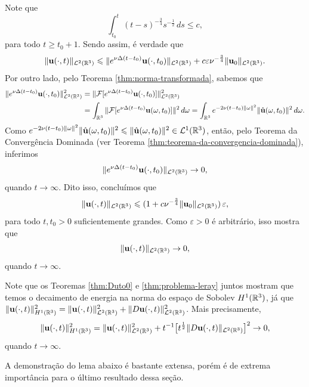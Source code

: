 \begin{prf}
\[    \]
    Note que
    \[
        \int_{t_0}^t (t - s)^{-\frac{3}{4}}s^{-\frac{1}{2}}\,ds \leqslant c,
    \]
    para todo $t \geqslant t_0 + 1$. Sendo assim, é verdade que
    \[
        \Vert \mathbf{u}(\cdot,t) \Vert_{\mathcal{L}^2(\mathbb{R}^3)} \leqslant \Vert e^{\nu\Delta(t - t_0)} \mathbf{u}(\cdot,t_0) \Vert_{\mathcal{L}^2(\mathbb{R}^3)} + c\varepsilon\nu^{-\frac{3}{4}} \Vert \mathbf{u}_0 \Vert_{\mathcal{L}^2(\mathbb{R}^3)}.
    \]
    Por outro lado, pelo Teorema \ref{thm:norma-transformada}, sabemos que
    \[
        \begin{aligned}
            \Vert e^{\nu \Delta (t-t_0)} \mathbf{u}(\cdot,t_0) \Vert_{\mathcal{L}^2(\mathbb{R}^3)}^2 &= \Vert \mathcal{F} [ e^{\nu \Delta (t-t_0) }\mathbf{u}(\cdot,t_0)] \Vert_{\mathcal{L}^2(\mathbb{R}^3)}^2\\ &= \int_{\mathbb{R}^3} \Vert \mathcal{F}[ e^{\nu \Delta (t-t_0)} \mathbf{u}(\omega,t_0)]\Vert^2 \,d\omega = \int_{\mathbb{R}^3} e^{-2\nu (t-t_0) \Vert \omega \Vert^2} \Vert \hat{\mathbf{u}} (\omega,t_0) \Vert^2 \,d\omega.
        \end{aligned}
    \]
    Como $e^{-2\nu (t-t_0) \Vert \omega \Vert^2} \Vert \hat{\mathbf{u}}(\omega,t_0) \Vert^2 \leqslant \Vert \hat{\mathbf{u}}(\omega,t_0) \Vert^2 \in \mathcal{L}^1(\mathbb{R}^3)$, então, pelo Teorema da Convergência Dominada (ver Teorema \ref{thm:teorema-da-convergencia-dominada}), inferimos
    \[
        \Vert e^{\nu \Delta (t-t_0)} \mathbf{u}(\cdot,t_0) \Vert_{\mathcal{L}^2(\mathbb{R}^3)} \to 0,
    \]
    quando $t \to \infty$. Dito isso, concluímos que
    \[
        \Vert \mathbf{u}(\cdot,t) \Vert_{\mathcal{L}^2(\mathbb{R}^3)} \leqslant (1 + c \nu^{-\frac{3}{4}} \Vert \mathbf{u}_0 \Vert_{\mathcal{L}^2(\mathbb{R}^3)}) \,\varepsilon,
    \]
    para todo $t,t_0 > 0$ suficientemente grandes.
    Como $\varepsilon > 0$ é arbitrário, isso mostra que
    \[
        \Vert \mathbf{u}(\cdot,t) \Vert_{\mathcal{L}^2(\mathbb{R}^3)} \to 0,
    \]
    quando $t \to \infty$.
\end{prf}

Note que os Teoremas \ref{thm:Duto0} e \ref{thm:problema-leray} juntos mostram que temos o decaimento de energia na norma do espaço de Sobolev $H^1(\mathbb{R}^3)$, já que $\Vert \mathbf{u}(\cdot,t) \Vert_{H^1(\mathbb{R}^3)}^2 = \Vert \mathbf{u}(\cdot,t) \Vert_{\mathcal{L}^2(\mathbb{R}^3)}^2 + \Vert D\mathbf{u}(\cdot,t) \Vert_{\mathcal{L}^2(\mathbb{R}^3)}^2$. Mais precisamente,
\[
    \Vert \mathbf{u}(\cdot,t) \Vert_{H^1(\mathbb{R}^3)}^2 = \Vert \mathbf{u}(\cdot,t) \Vert_{\mathcal{L}^2(\mathbb{R}^3)}^2 + t^{-1} \big[ t^{\frac{1}{2}} \Vert D\mathbf{u}(\cdot,t) \Vert_{\mathcal{L}^2(\mathbb{R}^3)}\big]^2 \to 0,
\]
quando $t \to \infty$.

A demonstração do lema abaixo é bastante extensa, porém é de extrema importância para o último resultado dessa seção.

